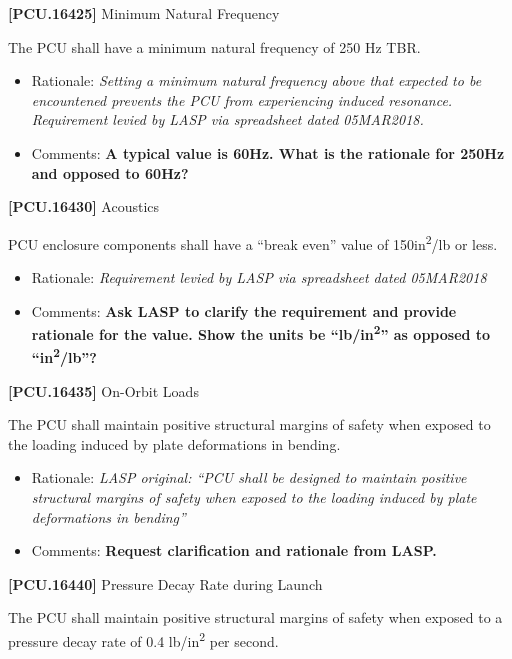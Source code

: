 \textbf{[PCU.16425]} Minimum Natural Frequency

The \gls{PCU} shall have a minimum natural frequency of 250 Hz TBR\label{tbx_13}.

\begin{itemize}
\item{} Rationale: \emph{Setting a minimum natural frequency above that expected to be encountened prevents the PCU from experiencing induced resonance. Requirement levied by LASP via spreadsheet dated 05MAR2018.}

\item{} Comments: \textbf{A typical value is 60Hz. What is the rationale for 250Hz and opposed to 60Hz?}

\end{itemize}

\textbf{[PCU.16430]} Acoustics

\gls{PCU} enclosure components shall have a ``break even'' value of 150in\textsuperscript{2}\slash lb or less.

\begin{itemize}
\item{} Rationale: \emph{Requirement levied by LASP via spreadsheet dated 05MAR2018}

\item{} Comments: \textbf{Ask LASP to clarify the requirement and provide rationale for the value. Show the units be ``lb\slash in\textsuperscript{2}'' as opposed to ``in\textsuperscript{2}\slash lb''?}

\end{itemize}

\textbf{[PCU.16435]} On-Orbit Loads

The \gls{PCU} shall maintain positive structural margins of safety when exposed to the loading induced by plate deformations in bending.

\begin{itemize}
\item{} Rationale: \emph{LASP original: ``PCU shall be designed to maintain positive structural margins of safety when exposed to the loading induced by plate deformations in bending''}

\item{} Comments: \textbf{Request clarification and rationale from LASP.}

\end{itemize}

\textbf{[PCU.16440]} Pressure Decay Rate during Launch

The \gls{PCU} shall maintain positive structural margins of safety when exposed to a pressure decay rate of 0.4 lb\slash in\textsuperscript{2} per second.

